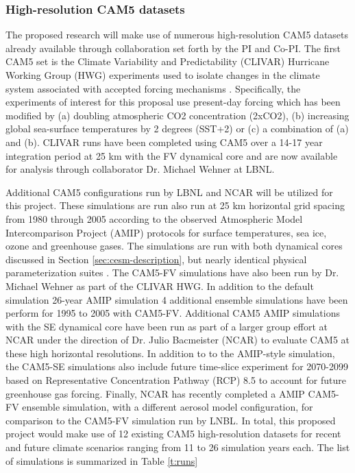 \documentclass[11pt]{article}
\begin{document}
\subsubsection{High-resolution CAM5 datasets} \label{sec:CAM-data} 

The proposed research will make use of numerous high-resolution CAM5 datasets already available through collaboration set forth by the PI and Co-PI. The first CAM5 set is the Climate Variability and Predictability (CLIVAR) Hurricane Working Group (HWG) experiments used to isolate changes in the climate system associated with accepted forcing mechanisms \citep{Wehner2015}.  Specifically, the experiments of interest for this proposal use present-day forcing which has been modified by (a) doubling atmospheric CO2 concentration (2xCO2), (b) increasing global sea-surface temperatures by 2 degrees (SST+2) or (c) a combination of (a) and (b).  CLIVAR runs have been completed using CAM5 over a 14-17 year integration period at 25 km with the FV dynamical core and are now available for analysis through collaborator Dr. Michael Wehner at LBNL.

Additional CAM5 configurations run by LBNL and NCAR will be utilized for this project. These simulations are run also run at 25 km horizontal grid spacing from 1980 through 2005 according to the observed Atmospheric Model Intercomparison Project (AMIP) protocols \citep{Gates1992,Gates1999} for surface temperatures, sea ice, ozone and greenhouse gases. The simulations are run with both dynamical cores discussed in Section \ref{sec:cesm-description}, but nearly identical physical parameterization suites \citep{RBNetal2010NCAR}. The CAM5-FV simulations have also been run by Dr. Michael Wehner as part of the CLIVAR HWG. In addition to the default simulation 26-year AMIP simulation 4 additional ensemble simulations have been perform for 1995 to 2005 with CAM5-FV. Additional CAM5 AMIP simulations with the SE dynamical core have been run as part of a larger group effort at NCAR under the direction of Dr. Julio Bacmeister (NCAR) to evaluate CAM5 at these high horizontal resolutions. In addition to to the AMIP-style simulation, the CAM5-SE simulations also include future time-slice experiment for 2070-2099 based on Representative Concentration Pathway (RCP) 8.5 to account for future greenhouse gas forcing. Finally, NCAR has recently completed a AMIP CAM5-FV ensemble simulation, with a different aerosol model configuration, for comparison to the CAM5-FV simulation run by LNBL.  In total, this proposed project would make use of 12 existing CAM5 high-resolution datasets for recent and future climate scenarios ranging from 11 to 26 simulation years each.  The list of simulations is summarized in Table \ref{t:runs}
\end{document}

